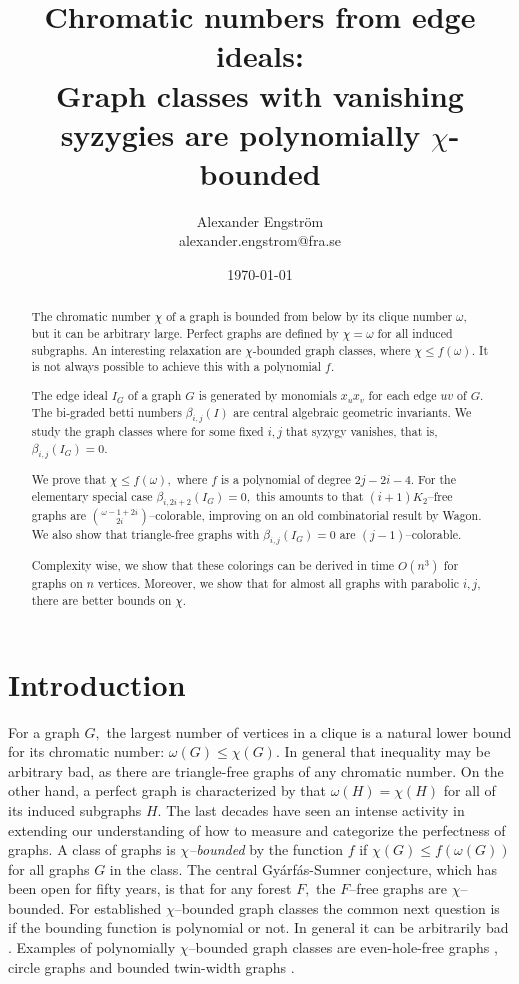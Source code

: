 \documentclass{article}
\title{Chromatic numbers from edge ideals:\\ Graph classes with vanishing syzygies are polynomially $\chi$-bounded}
\author{ Alexander Engström\\ alexander.engstrom@fra.se }
\date\today
\theoremstyle{plain}
\theoremstyle{definition}
\begin{document}
\maketitle

\begin{abstract}
The chromatic number $\chi$ of a graph is bounded from below by its clique number $\omega,$ but it can be arbitrary large. Perfect graphs are defined by $\chi=\omega$ for all induced subgraphs. An interesting relaxation are $\chi$-bounded graph classes, where $\chi\leq f(\omega).$ It is not always possible to achieve this with a polynomial $f.$


The edge ideal $I_G$ of a graph $G$ is generated by monomials $x_ux_v$ for each edge $uv$ of $G.$ The bi-graded betti numbers $\beta_{i,j}(I)$ are central algebraic geometric invariants. We study the graph classes where for some fixed $i,j$ that syzygy vanishes, that is, $\beta_{i,j}(I_G)=0.$ 

We prove that $\chi\leq f(\omega),$ where $f$ is a polynomial of degree $2j-2i-4.$
For the elementary special case $\beta_{i,2i+2}(I_G)=0,$ this  amounts to that $(i+1)K_2$--free graphs are ${\omega-1+2i \choose 2i}$--colorable, improving on an old combinatorial result by Wagon. 
We also show that triangle-free graphs with $\beta_{i,j}(I_G)=0$ are $(j-1)$--colorable.

Complexity wise, we show that these colorings can be derived in time $O(n^3)$ for graphs on $n$ vertices. Moreover, we show that for almost all graphs with parabolic $i,j,$ there are better bounds on $\chi.$
\end{abstract}

\section{Introduction}

For a graph $G,$ the largest number of vertices in a clique is a natural lower bound for its chromatic number: $\omega(G) \leq \chi(G).$ In general that inequality may be arbitrary bad, as there are triangle-free graphs of any chromatic number. On the other hand, a perfect graph is characterized by that $\omega(H) = \chi(H)$ for all of its induced subgraphs $H.$ The last decades have seen an intense activity in extending our understanding of how to measure and categorize the perfectness of graphs. A class of graphs is \emph{$\chi$--bounded} by the function $f$ if $\chi(G) \leq f(\omega(G))$ for all graphs $G$ in the class. The central Gyárfás-Sumner conjecture, which has been open for fifty years, is that for any forest $F,$ the $F$--free graphs are $\chi$--bounded.
For established $\chi$--bounded graph classes the common next question is if the bounding function is polynomial or not. In general it can be arbitrarily bad \cite{REF1}. Examples of polynomially $\chi$--bounded graph classes are even-hole-free graphs \cite{CS23}, circle graphs \cite{DM21, Dav22} and bounded twin-width graphs \cite{BT25}.
\end{document}
